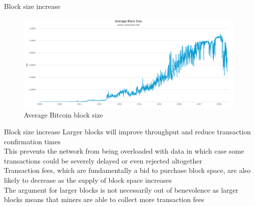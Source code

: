 \documentclass[10pt]{beamer}
\begin{document}
\begin{frame}{Block size increase}
	\begin{figure}[]
		\centering
		\includegraphics  [scale=0.25]{Images/average-block-size}
		\caption{Average Bitcoin block size}
	\end{figure}
\end{frame}


\begin{frame}{Block size increase}
	Larger blocks will improve throughput and reduce transaction confirmation times \\ \vspace{3mm}
	This prevents the network from being overloaded with data in which case some transactions could be severely delayed or even rejected altogether\\ \vspace{3mm}
	Transaction fees, which are fundamentally a bid to purchase block space, are also likely to decrease as the supply of block space increases\\ \vspace{3mm}
	The argument for larger blocks is not necessarily out of benevolence as larger blocks means that miners are able to collect more transaction fees \\ \vspace{3mm}
\end{frame}

\end{document}

